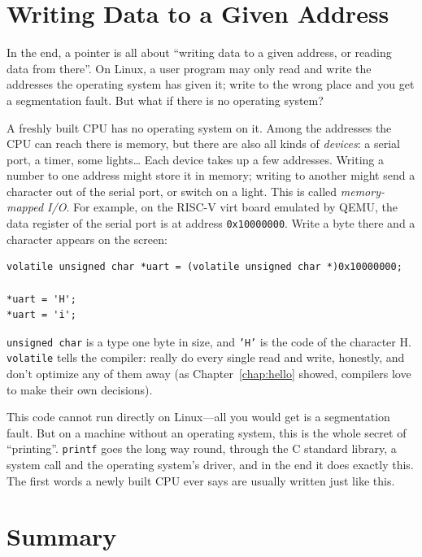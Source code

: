 \section{Writing Data to a Given Address}
\label{sec:mmio}

In the end, a pointer is all about ``writing data to a given address, or reading data from there''. On Linux, a user program may only read and write the addresses the operating system has given it; write to the wrong place and you get a segmentation fault. But what if there is no operating system?

A freshly built CPU has no operating system on it. Among the addresses the CPU can reach there is memory, but there are also all kinds of \emph{devices}: a serial port, a timer, some lights\ldots{} Each device takes up a few addresses. Writing a number to one address might store it in memory; writing to another might send a character out of the serial port, or switch on a light. This is called \emph{memory-mapped I/O}. For example, on the RISC-V virt board emulated by QEMU, the data register of the serial port is at address \texttt{0x10000000}. Write a byte there and a character appears on the screen:
\begin{verbatim}
volatile unsigned char *uart = (volatile unsigned char *)0x10000000;

*uart = 'H';
*uart = 'i';
\end{verbatim}

\texttt{unsigned char} is a type one byte in size, and \texttt{'H'} is the code of the character H. \texttt{volatile} tells the compiler: really do every single read and write, honestly, and don't optimize any of them away (as Chapter~\ref{chap:hello} showed, compilers love to make their own decisions).

This code cannot run directly on Linux---all you would get is a segmentation fault. But on a machine without an operating system, this is the whole secret of ``printing''. \texttt{printf} goes the long way round, through the C standard library, a system call and the operating system's driver, and in the end it does exactly this. The first words a newly built CPU ever says are usually written just like this.

\section{Summary}

